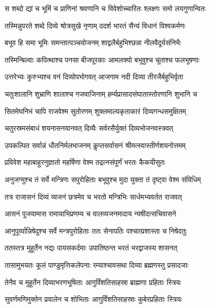 \twolineshloka
{स शब्दो द्यां च भूमिं च प्राणिनां श्रवणानि च}
{विवेशोच्चारितः श्लक्ष्णः समो लयगुणान्वितः} %

\twolineshloka
{तस्मिन्नुपरते शब्दे दिव्ये श्रोत्रसुखे नृणाम्}
{ददर्श भारतं सैन्यं विधानं विश्वकर्मणः} %

\twolineshloka
{बभूव हि समा भूमिः समन्तात्पञ्चयोजनम्}
{शाद्वलैर्बहुभिश्छन्ना नीलवैदूर्यसंनिभैः} %

\twolineshloka
{तस्मिन्बिल्वाः कपित्थाश्च पनसा बीजपूरकाः}
{आमलक्यो बभूवुश्च चूताश्च फलभूषणाः} %

\twolineshloka
{उत्तरेभ्यः कुरुभ्यश्च वनं दिव्योपभोगवत्}
{आजगाम नदी दिव्या तीरजैर्बहुभिर्वृता} %

\twolineshloka
{चतुःशालानि शुभ्राणि शालाश्च गजवाजिनाम्}
{हर्म्यप्रासादसंघातास्तोरणानि शुभानि च} %

\twolineshloka
{सितमेघनिभं चापि राजवेश्म सुतोरणम्}
{शुक्लमाल्यकृताकारं दिव्यगन्धसमुक्षितम्} %

\twolineshloka
{चतुरस्रमसंबाधं शयनासनयानवत्}
{दिव्यैः सर्वरसैर्युक्तं दिव्यभोजनवस्त्रवत्} %

\twolineshloka
{उपकल्पित सर्वान्नं धौतनिर्मलभाजनम्}
{कॢप्तसर्वासनं श्रीमत्स्वास्तीर्णशयनोत्तमम्} %

\twolineshloka
{प्रविवेश महाबाहुरनुज्ञातो महर्षिणा}
{वेश्म तद्रत्नसंपूर्णं भरतः कैकयीसुतः} %

\twolineshloka
{अनुजग्मुश्च तं सर्वे मन्त्रिणः सपुरोहिताः}
{बभूवुश्च मुदा युक्ता तं दृष्ट्वा वेश्म संविधिम्} %

\twolineshloka
{तत्र राजासनं दिव्यं व्यजनं छत्रमेव च}
{भरतो मन्त्रिभिः सार्धमभ्यवर्तत राजवत्} %

\twolineshloka
{आसनं पूजयामास रामायाभिप्रणम्य च}
{वालव्यजनमादाय न्यषीदत्सचिवासने} %

\twolineshloka
{आनुपूर्व्यान्निषेदुश्च सर्वे मन्त्रपुरोहिताः}
{ततः सेनापतिः पश्चात्प्रशास्ता च निषेदतुः} %

\twolineshloka
{ततस्तत्र मुहूर्तेन नद्यः पायसकर्दमाः}
{उपातिष्ठन्त भरतं भरद्वाजस्य शासनत्} %

\twolineshloka
{तासामुभयतः कूलं पाण्डुमृत्तिकलेपनाः}
{रम्याश्चावसथा दिव्या ब्रह्मणस्तु प्रसादजाः} %

\twolineshloka
{तेनैव च मुहूर्तेन दिव्याभरणभूषिताः}
{आगुर्विंशतिसाहस्रा ब्राह्मणा प्रहिताः स्त्रियः} %

\twolineshloka
{सुवर्णमणिमुक्तेन प्रवालेन च शोभिताः}
{आगुर्विंशतिसाहस्राः कुबेरप्रहिताः स्त्रियः} %

